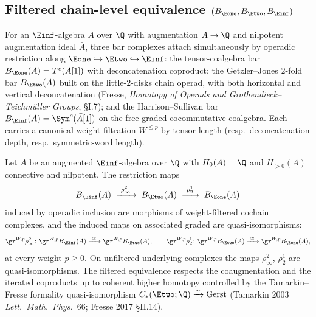 \providecommand{\Gerst}{\mathrm{Gerst}}
\providecommand{\Assoc}{\mathrm{Assoc}}
\providecommand{\MZV}{\mathrm{MZV}}
\providecommand{\GC}{\mathrm{GC}}
\providecommand{\pt}{\mathrm{pt}}

\subsection{Filtered chain-level equivalence \texorpdfstring{$(B_{\Eone}, B_{\Etwo}, B_{\Einf})$}{(B E1, B E2, B E-inf)}}
\label{subsec:filtered-en-bar-equivalence}

For an $\Einf$-algebra $A$ over $\Q$ with augmentation $A \to \Q$ and nilpotent augmentation ideal $\bar A$, three bar complexes attach simultaneously by operadic restriction along $\Eone \hookrightarrow \Etwo \hookrightarrow \Einf$: the tensor-coalgebra bar $B_{\Eone}(A) = T^c(\bar A[1])$ with deconcatenation coproduct; the Getzler--Jones $2$-fold bar $B_{\Etwo}(A)$ built on the little-$2$-disks chain operad, with both horizontal and vertical deconcatenation (Fresse, \emph{Homotopy of Operads and Grothendieck--Teichm\"uller Groups}, \S I.7); and the Harrison--Sullivan bar $B_{\Einf}(A) = \Sym^c(\bar A[1])$ on the free graded-cocommutative coalgebra. Each carries a canonical weight filtration $W^{\le p}$ by tensor length (resp.\ deconcatenation depth, resp.\ symmetric-word length).

\begin{theorem}
\label{thm:filtered-en-bar-equivalence}
Let $A$ be an augmented $\Einf$-algebra over $\Q$ with $H_0(A) = \Q$ and $H_{>0}(A)$ connective and nilpotent. The restriction maps
\[
B_{\Einf}(A) \;\xrightarrow{\ \rho_\infty^2\ }\; B_{\Etwo}(A) \;\xrightarrow{\ \rho_2^1\ }\; B_{\Eone}(A)
\]
induced by operadic inclusion are morphisms of weight-filtered cochain complexes, and the induced maps on associated graded are quasi-isomorphisms:
\begin{equation}
\gr^{W,p} \rho_\infty^2 \colon \gr^{W,p} B_{\Einf}(A) \xrightarrow{\ \simeq\ } \gr^{W,p} B_{\Etwo}(A), \qquad
\gr^{W,p} \rho_2^1 \colon \gr^{W,p} B_{\Etwo}(A) \xrightarrow{\ \simeq\ } \gr^{W,p} B_{\Eone}(A),
\end{equation}
at every weight $p \geq 0$. On unfiltered underlying complexes the maps $\rho_\infty^2$, $\rho_2^1$ are quasi-isomorphisms. The filtered equivalence respects the coaugmentation and the iterated coproducts up to coherent higher homotopy controlled by the Tamarkin--Fresse formality quasi-isomorphism $C_*(\Etwo; \Q) \xrightarrow{\sim} \Gerst$ (Tamarkin 2003 \emph{Lett.\ Math.\ Phys.}~66; Fresse 2017 \S II.14).
\end{theorem}

